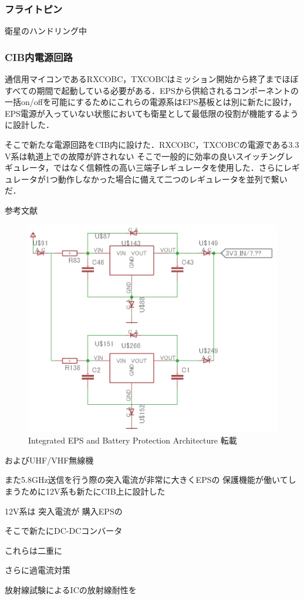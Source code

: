 \subsubsection{フライトピン}
衛星のハンドリング中




\subsubsection{CIB内電源回路}
通信用マイコンであるRXCOBC，TXCOBCはミッション開始から終了までほぼすべての期間で起動している必要がある．EPSから供給されるコンポーネントの一括on/offを可能にするためにこれらの電源系はEPS基板とは別に新たに設け，EPS電源が入っていない状態においても衛星として最低限の役割が機能するように設計した．




そこで新たな電源回路をCIB内に設けた．RXCOBC，TXCOBCの電源である3.3 V系は軌道上での故障が許されない
そこで一般的に効率の良いスイッチングレギュレータ，ではなく信頼性の高い三端子レギュレータを使用した．さらにレギュレータが1つ動作しなかった場合に備えて二つのレギュレータを並列で繋いだ．

参考文献


\begin{figure}[htbp]
	\begin{center}
		\includegraphics[width=0.6\linewidth]{./03/fig/3V3.png}
		\caption{Integrated EPS and Battery Protection Architecture 転載}
		\label{fig3_1_inhibit_d}
	\end{center}
\end{figure}

およびUHF/VHF無線機


また5.8GHz送信を行う際の突入電流が非常に大きくEPSの
保護機能が働いてしまうために12V系も新たにCIB上に設計した


12V系は
突入電流が
購入EPSの

そこで新たにDC-DCコンバータ

これらは二重に

さらに過電流対策

放射線試験によるICの放射線耐性を



